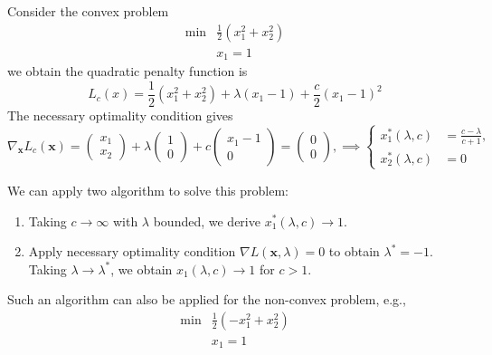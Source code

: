 \begin{example}
Consider the convex problem
\[
\begin{array}{ll}
\min&\frac{1}{2}(x_1^2+x_2^2)\\
&x_1=1
\end{array}
\]
we obtain the quadratic penalty function is 
\[
L_c(x)=\frac{1}{2}(x_1^2+x_2^2) + \lambda(x_1-1)+\frac{c}{2}(x_1-1)^2
\]
The necessary optimality condition gives
\[
\nabla_{\bm x}L_c(\bm x)=\begin{pmatrix}
x_1\\x_2
\end{pmatrix}+\lambda\begin{pmatrix}
1\\0
\end{pmatrix}+c\begin{pmatrix}
x_1-1\\0
\end{pmatrix}=\begin{pmatrix}
0\\0
\end{pmatrix},\implies
\left\{\begin{aligned}
x_1^*(\lambda,c)&=\frac{c-\lambda}{c+1},\\
x_2^*(\lambda,c)&=0
\end{aligned}\right.
\]

We can apply two algorithm to solve this problem:
\begin{enumerate}
\item
Taking $c\to\infty$ with $\lambda$ bounded, we derive $x_1^*(\lambda,c)\to1$.
\item
Apply necessary optimality condition $\nabla L(\bm x,\lambda)=0$ to obtain $\lambda^*=-1$. Taking $\lambda\to\lambda^*$, we obtain $x_1(\lambda,c)\to1$ for $c>1$.
\end{enumerate}
\end{example}
Such an algorithm can also be applied for the non-convex problem, e.g.,
\[
\begin{array}{ll}
\min&\frac{1}{2}(-x_1^2+x_2^2)\\
&x_1=1
\end{array}
\]













